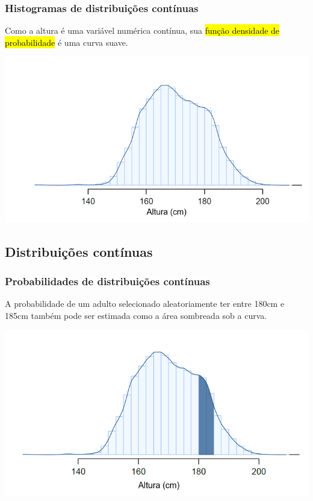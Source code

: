 \begin{frame}
\frametitle{Histogramas de distribuições contínuas}
\justifying
Como a altura é uma variável numérica contínua, sua \hl{função densidade de probabilidade} é uma curva suave.

\begin{center}
\includegraphics[width=\textwidth]{2-5_continuous_distributions/fdicHeightContDist.png}
\end{center}

\end{frame}


\subsection{Distribuições contínuas}

\begin{frame}
\frametitle{Probabilidades de distribuições contínuas}
\justifying
A probabilidade de um adulto selecionado aleatoriamente ter entre 180cm e 185cm também pode ser estimada como a área sombreada sob a curva.

\begin{center}
\includegraphics[width=\textwidth]{2-5_continuous_distributions/fdicHeightContDistFilled.png}
\end{center}


\end{frame}

